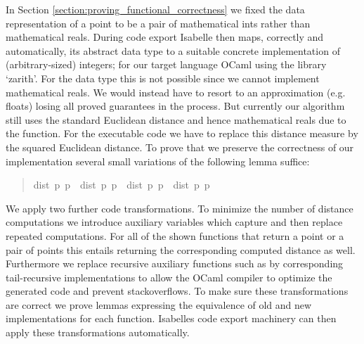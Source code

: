 \begin{isabellebody}
\begin{isamarkuptext}
In Section \ref{section:proving_functional_correctness} we fixed the data representation of a point
to be a pair of mathematical ints rather than mathematical reals. During code export Isabelle
then maps, correctly and automatically, its abstract data type  to a suitable concrete
implementation of (arbitrary-sized) integers; for our target language OCaml using the library `zarith'.
For the data type  this is not possible since we cannot implement mathematical reals. We would instead
have to resort to an approximation (e.g. floats) losing all proved guarantees in the process.
But currently our algorithm still uses the standard Euclidean distance and hence mathematical reals due
to the  function. For the executable code we have to replace this distance measure by the
squared Euclidean distance. To prove that we preserve the correctness of our implementation several
small variations of the following lemma suffice:
%
\begin{quote}
%
\begin{isabelle}%
dist\ p\ p\ {\isasymle}\ dist\ p\ p\ {\isasymlongleftrightarrow}\ {\isacharparenleft}dist\ p\ p\ {\isasymle}\ {\isacharparenleft}dist\ p\ p%
\end{isabelle}
\end{quote}
%
We apply two further code transformations. To minimize the number of distance computations we introduce
auxiliary variables which capture and then replace repeated computations. For all of the shown
functions that return a point or a pair of points this entails returning the
corresponding computed distance as well. Furthermore we replace recursive auxiliary functions such as
 by corresponding tail-recursive implementations to allow the OCaml compiler to
optimize the generated code and prevent stackoverflows. To make sure these transformations are correct
we prove lemmas expressing the equivalence of old and new implementations for each function.
Isabelles code export machinery can then apply these transformations automatically.


\end{isamarkuptext}
\end{isabellebody}
